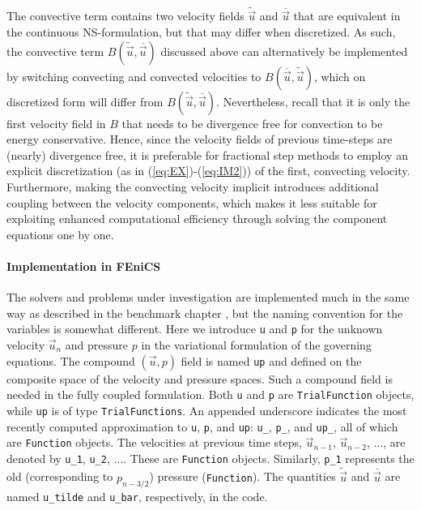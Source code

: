 The convective term contains two velocity fields $\tilde{\vec{u}}$ and
$\overline{\vec{u}}$ that are equivalent in the continuous NS-formulation, but that may differ when
discretized. As such, the convective term
$B(\tilde{\vec{u}},\overline{\vec{u}})$ discussed above can
alternatively be implemented by switching convecting and convected
velocities to $B(\overline{\vec{u}},\tilde{\vec{u}})$, which on
discretized form will differ from
$B(\tilde{\vec{u}},\overline{\vec{u}})$. Nevertheless, recall that it
is only the first velocity field in $B$ that needs to be divergence
free for convection to be energy conservative. Hence, since the
velocity fields of previous time-steps are (nearly) divergence free,
it is preferable for fractional step
methods to employ an explicit discretization (as in
(\ref{eq:EX})-(\ref{eq:IM2})) of the first, convecting
velocity. Furthermore, making the convecting velocity implicit
introduces additional coupling between the velocity components, which
makes it less suitable for exploiting enhanced computational efficiency
through solving the component equations one by one.

\paragraph{Implementation in FEniCS}
\label{sec:impl_fenics}
The solvers and problems under investigation are implemented much in the
same way as described in the benchmark chapter \cite{nsValen-SendstadLoggMardalEtAl2010}, but the naming
convention for the variables is somewhat different. Here we introduce
{\fontsize{12pt}{12pt}\texttt{u}} and {\fontsize{12pt}{12pt}\texttt{p}} for the unknown velocity $\vec{u}_n$ and pressure $p$
in the
variational formulation of the governing equations.
The compound
$(\vec{u},p)$ field is named {\fontsize{12pt}{12pt}\texttt{up}} and
defined on the composite space of the velocity and
pressure spaces. Such a compound field is needed in the
fully coupled formulation.
Both {\fontsize{12pt}{12pt}\texttt{u}} and {\fontsize{12pt}{12pt}\texttt{p}} are
{\fontsize{12pt}{12pt}\texttt{TrialFunction}} objects, while {\fontsize{12pt}{12pt}\texttt{up}} is of type {\fontsize{12pt}{12pt}\texttt{TrialFunctions}}.
An appended underscore indicates
the most recently computed
approximation to {\fontsize{12pt}{12pt}\texttt{u}}, {\fontsize{12pt}{12pt}\texttt{p}}, and {\fontsize{12pt}{12pt}\texttt{up}}:
{\fontsize{12pt}{12pt}\verb!u_!}, {\fontsize{12pt}{12pt}\verb!p_!}, and {\fontsize{12pt}{12pt}\verb!up_!}, all of which are {\fontsize{12pt}{12pt}\texttt{Function}} objects.
The velocities at previous time steps, $\vec{u}_{n-1}$, $\vec{u}_{n-2}$, $\ldots$, are denoted by {\fontsize{12pt}{12pt}\verb!u_1!}, {\fontsize{12pt}{12pt}\verb!u_2!}, $\ldots$. These are
{\fontsize{12pt}{12pt}\texttt{Function}} objects. Similarly, {\fontsize{12pt}{12pt}\verb!p_1!} represents the old (corresponding to $p_{n-3/2}$)  pressure
({\fontsize{12pt}{12pt}\texttt{Function}}).
The quantities $\tilde{\vec{u}}$ and $\overline{\vec{u}}$ are
named {\fontsize{12pt}{12pt}\verb!u_tilde!} and {\fontsize{12pt}{12pt}\verb!u_bar!}, respectively, in the code.

